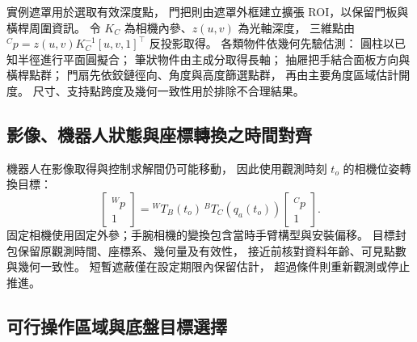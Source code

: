 實例遮罩用於選取有效深度點，
門把則由遮罩外框建立擴張 ROI，以保留門板與橫桿周圍資訊。
令 $K_C$ 為相機內參、$z(u,v)$ 為光軸深度，
三維點由 $ {}^Cp=z(u,v)K_C^{-1}[u,v,1]^\top$ 反投影取得。
各類物件依幾何先驗估測：
圓柱以已知半徑進行平面圓擬合；
筆狀物件由主成分取得長軸；
抽屜把手結合面板方向與橫桿點群；
門扇先依鉸鏈徑向、角度與高度篩選點群，
再由主要角度區域估計開度。
尺寸、支持點跨度及幾何一致性用於排除不合理結果。

\subsection{影像、機器人狀態與座標轉換之時間對齊}
\label{subsec:visual_state_time_alignment}

機器人在影像取得與控制求解間仍可能移動，
因此使用觀測時刻 $t_o$ 的相機位姿轉換目標：
\begin{equation}
    \begin{bmatrix}{}^Wp\\1\end{bmatrix}
    ={}^WT_B(t_o)\,{}^BT_C(q_a(t_o))
    \begin{bmatrix}{}^Cp\\1\end{bmatrix}.
    \label{eq:ch3_visual_timestamp_transform}
\end{equation}
固定相機使用固定外參；手腕相機的變換包含當時手臂構型與安裝偏移。
目標封包保留原觀測時間、座標系、幾何量及有效性，
接近前核對資料年齡、可見點數與幾何一致性。
短暫遮蔽僅在設定期限內保留估計，
超過條件則重新觀測或停止推進。

\subsection{可行操作區域與底盤目標選擇}
\label{subsec:feasible_operation_base_selection}

